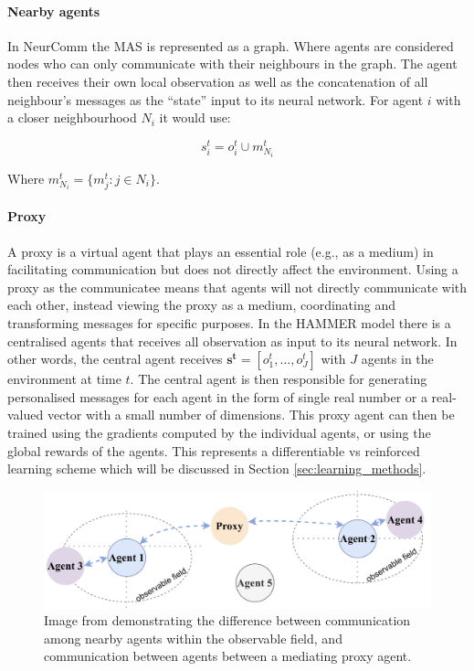 \documentclass{article}
\begin{document}
\paragraph{Nearby agents} In NeurComm \citep{chu2020NeurComm} the MAS is represented as a graph. Where agents are considered nodes who can only communicate with their neighbours in the graph. The agent then receives their own local observation as well as the concatenation of all neighbour's messages as the ``state'' input to its neural network. For agent $i$ with a closer neighbourhood $N_i$ it would use:

\begin{equation}
	s_i^t = o_i^t \cup m_{N_i}^t 
\end{equation}

Where $m_{N_i}^t = \{ m_j^t : j \in N_i \}$.

\paragraph{Proxy} A proxy is a virtual agent that plays an essential role (e.g., as a medium) in facilitating communication but does not directly affect the environment. Using a proxy as the communicatee means that agents will not directly communicate with each other, instead viewing the proxy as a medium, coordinating and transforming messages for specific purposes. In the HAMMER model \citep{gupta2022HAMMER} there is a centralised agents that receives all observation as input to its neural network. In other words, the central agent receives $\mathbf{s^t} = [o^t_1, \hdots, o_J^t]$ with $J$ agents in the environment at time $t$. The central agent is then responsible for generating personalised messages for each agent in the form of single real number or a real-valued vector with a small number of dimensions. This proxy agent can then be trained using the gradients computed by the individual agents, or using the global rewards of the agents. This represents a differentiable vs reinforced learning scheme which will be discussed in Section \ref{sec:learning_methods}. 

\begin{figure}
	\centering
	\includegraphics[scale=0.5]{images/communicatee.png}
	\caption{Image from \citet{zhu2024survey} demonstrating the difference between communication among nearby agents within the observable field, and communication between agents between a mediating proxy agent.}
	\label{fig:communicatee}
\end{figure}
\end{document}
